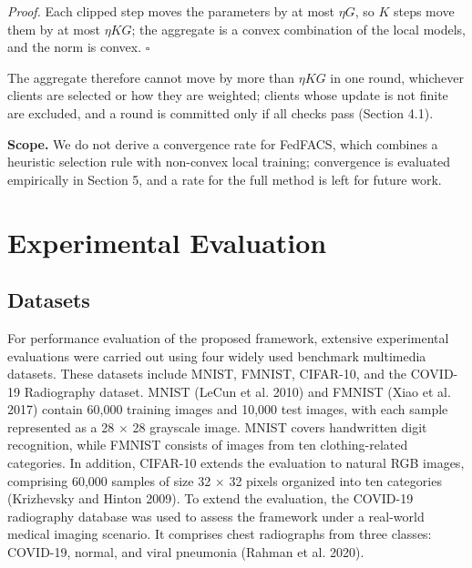 \documentclass[pdflatex,sn-mathphys-num,oneside]{sn-jnl}%
\theoremstyle{thmstyleone}%
\theoremstyle{thmstyletwo}%
\theoremstyle{thmstylethree}%
\begin{document}
\textit{Proof.} Each clipped step moves the parameters by at most $\eta G$, so $K$ steps move them by at most $\eta KG$; the aggregate is a convex combination of the local models, and the norm is convex. \hfill$\square$

The aggregate therefore cannot move by more than $\eta KG$ in one round, whichever clients are selected or how they are weighted; clients whose update is not finite are excluded, and a round is committed only if all checks pass (Section 4.1).

\textbf{Scope.} We do not derive a convergence rate for FedFACS, which combines a heuristic selection rule with non-convex local training; convergence is evaluated empirically in Section 5, and a rate for the full method is left for future work.

\section{Experimental Evaluation}\label{sec5}

\subsection{Datasets}

For performance evaluation of the proposed framework, extensive experimental evaluations were carried out using four widely used benchmark multimedia datasets. These datasets include MNIST, FMNIST, CIFAR-10, and the COVID-19 Radiography dataset. MNIST (LeCun et al. 2010) and FMNIST (Xiao et al. 2017) contain 60,000 training images and 10,000 test images, with each sample represented as a 28 \ensuremath{\times} 28 grayscale image. MNIST covers handwritten digit recognition, while FMNIST consists of images from ten clothing-related categories. In addition, CIFAR-10 extends the evaluation to natural RGB images, comprising 60,000 samples of size 32 \ensuremath{\times} 32 pixels organized into ten categories (Krizhevsky and Hinton 2009). To extend the evaluation, the COVID-19 radiography database was used to assess the framework under a real-world medical imaging scenario. It comprises chest radiographs from three classes: COVID-19, normal, and viral pneumonia (Rahman et al. 2020).  
\end{document}

